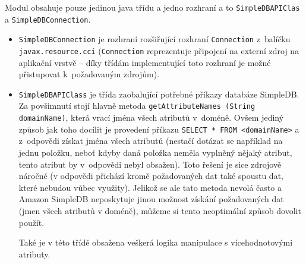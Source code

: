 \documentclass[oneside,12pt]{fithesis2}
\begin{document}
Modul obsahuje pouze jedinou java třídu a jedno rozhraní a to \texttt{SimpleDB\allowbreak APIClas} a \verb<SimpleDBConnection<.
\begin{itemize}
 \item \verb<SimpleDBConnection< je rozhraní rozšiřující rozhraní \verb<Connection< z~balíčku \verb<javax.resource.cci< (\verb<Connection< reprezentuje připojení na externí zdroj na aplikační vrstvě -- díky třídám implementující toto rozhraní je možné přistupovat k~požadovaným zdrojům).
 \item \verb<SimpleDBAPIClass< je třída zaobalující potřebné příkazy databáze SimpleDB. Za povšimnutí stojí hlavně metoda \texttt{getAttributeNames (String domainName)}, která vrací jména všech atributů v~doméně. Ovšem jediný způsob jak toho docílit je provedení příkazu \texttt{SELECT * FROM <domainName>} a z~odpovědi získat jména všech atributů (nestačí dotázat se například na jednu položku, neboť kdyby daná položka neměla vyplněný nějaký atribut, tento atribut by v~odpovědi nebyl obsažen). Toto řešení je sice zdrojově náročné (v odpovědi přichází kromě požadovaných dat také spoustu dat, které nebudou vůbec využity). Jelikož se ale tato metoda nevolá často a Amazon SimpleDB neposkytuje jinou možnost získání požadovaných dat (jmen všech atributů v doméně), můžeme si tento neoptimální způsob dovolit použít.
 
 Také je v této třídě obsažena veškerá logika manipulace s vícehodnotovými atributy.
\end{itemize}
\end{document}

